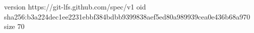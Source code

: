 version https://git-lfs.github.com/spec/v1
oid sha256:b3a224dec1ee2231ebbf384bdbb9399838aef5ed80a989939cea0e436b68a970
size 70
